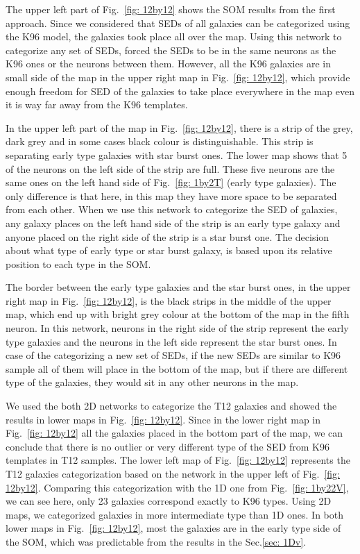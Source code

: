     The upper left part of Fig.~\ref{fig: 12by12} shows the SOM results from the first approach. 
    Since we considered that SEDs of all galaxies can be categorized using the K96 model, the galaxies took place all over the map.
    Using this network to categorize any set of SEDs, forced the SEDs to be in the same neurons as the K96 ones or the neurons between them.
    However, all the K96 galaxies are in small side of the map in the upper right map in Fig.~\ref{fig: 12by12}, which provide enough freedom for SED of the galaxies to take place everywhere in the map even it is way far away from the K96 templates.
    
    In the upper left part of the map in Fig.~\ref{fig: 12by12}, there is a strip of the grey, dark grey and in some cases black colour is distinguishable.
    This strip is separating early type galaxies with star burst ones.
    The lower map shows that 5 of the neurons on the left side of the strip are full. 
    These five neurons are the same ones on the left hand side of Fig.~\ref{fig: 1by2T} (early type galaxies).
    The only difference is that here, in this map they have more space to be separated from each other.
    When we use this network to categorize the SED of galaxies, any galaxy places on the left hand side of the strip is an early type galaxy and anyone placed on the right side of the strip is a star burst one.
    The decision about what type of early type or star burst galaxy, is based upon its relative position to each type in the SOM.
    
    The border between the early type galaxies and the star burst ones, in the upper right map in Fig.~\ref{fig: 12by12}, is the black strips in the middle of the upper map, which end up with bright grey colour at the bottom of the map in the fifth neuron.
    In this network, neurons in the right side of the strip represent the early type galaxies and the neurons in the left side represent the star burst ones. 
    In case of the categorizing a new set of SEDs, if the new SEDs are similar to K96 sample all of them will place in the bottom of the map, but if there are different type of the galaxies, they would sit in any other neurons in the map.
    
    We used the both 2D networks to categorize the T12 galaxies and showed the results in lower maps in Fig.~\ref{fig: 12by12}.
    Since in the lower right map in Fig.~\ref{fig: 12by12} all the galaxies placed in the bottom part of the map, we can conclude that there is no outlier or very different type of the SED from K96 templates in T12 samples.
    The lower left map of Fig.~\ref{fig: 12by12} represents the T12 galaxies categorization based on the network in the upper left of Fig.~\ref{fig: 12by12}. 
    Comparing this categorization with the 1D one from Fig.~\ref{fig: 1by22V}, we can see here, only 23 galaxies correspond exactly to K96 types.
    Using 2D maps, we categorized galaxies in more intermediate type than 1D ones.
    In both lower maps in Fig.~\ref{fig: 12by12}, most the galaxies are in the early type side of the SOM, which was predictable from the results in the Sec.\ref{sec: 1Dv}. 
    


